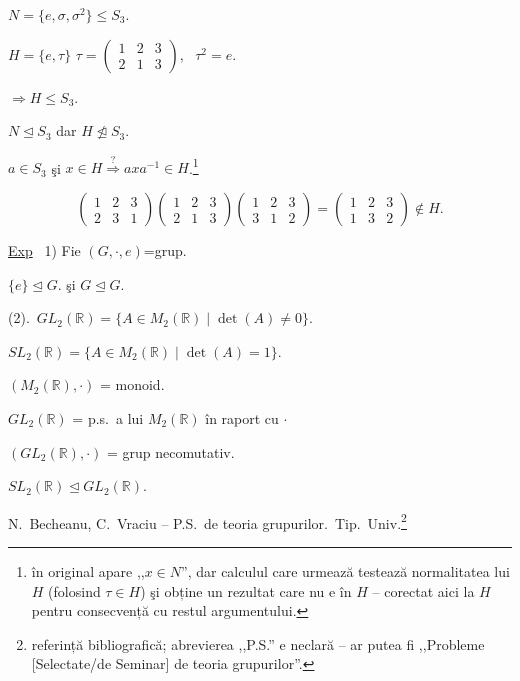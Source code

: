 \documentclass[12pt]{article}
\begin{document}
\noindent $N=\{e,\sigma,\sigma^2\} \leq S_3$.

\bigskip
\noindent $H=\{e,\tau\}$ \quad $\tau = \begin{pmatrix}1&2&3\\2&1&3\end{pmatrix}$, \ $\tau^2=e$.

\noindent $\Rightarrow H\leq S_3$.

\bigskip
\noindent $N \trianglelefteq S_3$ \quad dar \quad $H\not\trianglelefteq S_3$.

\bigskip
\noindent $a\in S_3$ şi $x\in H \overset{?}{\Rightarrow} axa^{-1}\in H$.\footnote{în original apare ,,$x\in N$'', dar calculul care urmează testează normalitatea lui $H$ (folosind $\tau\in H$) şi obține un rezultat care nu e în $H$ -- corectat aici la $H$ pentru consecvență cu restul argumentului.}

\[
\begin{pmatrix}1&2&3\\2&3&1\end{pmatrix}\begin{pmatrix}1&2&3\\2&1&3\end{pmatrix}\begin{pmatrix}1&2&3\\3&1&2\end{pmatrix} = \begin{pmatrix}1&2&3\\1&3&2\end{pmatrix} \notin H.
\]

\bigskip
\noindent\underline{Exp} \ 1) Fie $(G,\cdot,e)$=grup.

\noindent $\{e\}\trianglelefteq G$. \quad şi \quad $G\trianglelefteq G$.

\bigskip
\noindent (2).\ $GL_2(\mathbb{R}) = \{A\in M_2(\mathbb{R}) \mid \det(A)\neq 0\}$.

\noindent $SL_2(\mathbb{R}) = \{A\in M_2(\mathbb{R}) \mid \det(A)=1\}$.

\noindent $(M_2(\mathbb{R}),\cdot)$ = monoid.

\noindent $GL_2(\mathbb{R})$ = p.s.\ a lui $M_2(\mathbb{R})$ în raport cu $\cdot$

\noindent $(GL_2(\mathbb{R}),\cdot)$ = grup necomutativ.

\noindent $SL_2(\mathbb{R}) \trianglelefteq GL_2(\mathbb{R})$.

\bigskip
\noindent N.\ Becheanu, C.\ Vraciu -- P.S.\ de teoria grupurilor.\ Tip.\ Univ.\footnote{referință bibliografică; abrevierea ,,P.S.'' e neclară -- ar putea fi ,,Probleme [Selectate/de Seminar] de teoria grupurilor''.}
\end{document}
